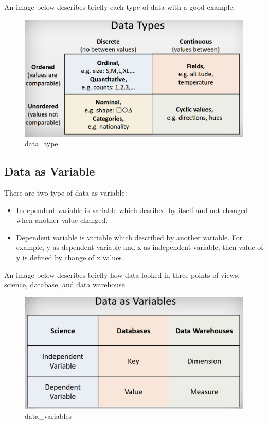 \documentclass[11pt]{article}
\makeatletter
\def\maxwidth{\ifdim\Gin@nat@width>\linewidth\linewidth
    \else\Gin@nat@width\fi}
\let\Oldincludegraphics\includegraphics
\renewcommand{\includegraphics}[1]{\Oldincludegraphics[width=.8\maxwidth]{#1}}
\providecommand{\tightlist}{%
      \setlength{\itemsep}{0pt}\setlength{\parskip}{0pt}}
\makeatother
\begin{document}
An image below describes briefly each type of data with a good example:

\begin{figure}
\centering
\includegraphics{images/data-type.png}
\caption{data\_type}
\end{figure}

    \subsection{Data as Variable}\label{data-as-variable}

There are two type of data as variable:

\begin{itemize}
\tightlist
\item
  Independent variable is variable which desribed by itself and not
  changed when another value changed.
\item
  Dependent variable is variable which described by another variable.
  For example, y as dependent variable and x as independent variable,
  then value of y is defined by change of x values.
\end{itemize}

An image below describes briefly how data looked in three points of
views: science, database, and data warehouse.

\begin{figure}
\centering
\includegraphics{images/data-variable.png}
\caption{data\_variables}
\end{figure}
\end{document}
